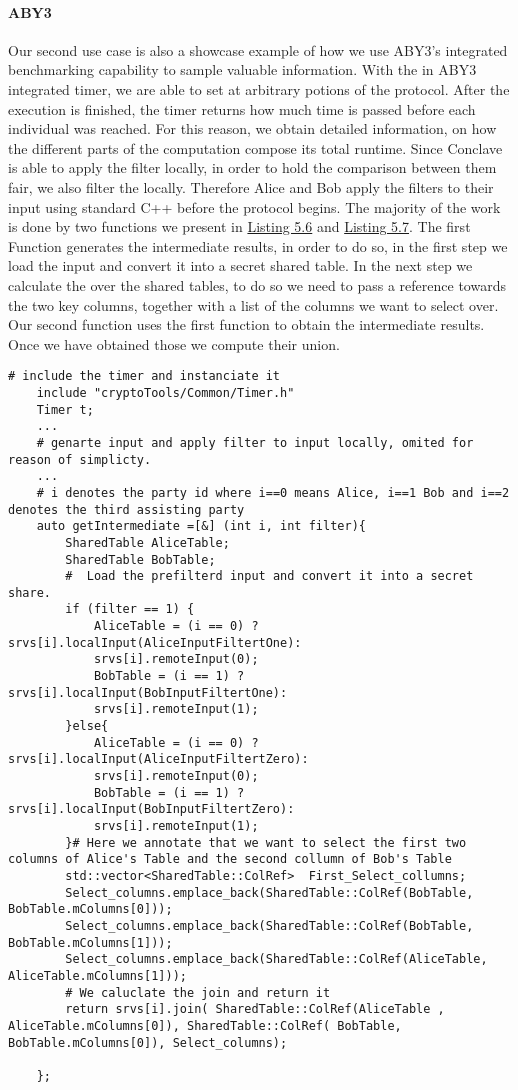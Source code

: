 \paragraph{ABY3}
Our second use case is also a showcase example of how we use ABY3's integrated benchmarking capability to sample valuable information. With the in ABY3 integrated timer, we are able to set  at arbitrary potions of the protocol. After the execution is finished, the timer returns how much time is passed before each individual  was reached. For this reason, we obtain detailed information, on how the different parts of the computation compose its total runtime. Since Conclave is able to apply the filter locally, in order to hold the comparison between them fair, we also filter the locally. Therefore Alice and Bob apply the filters to their input using standard C++ before the protocol begins. The majority of the work is done by two functions we present in \hyperref[Listing 5.6]{Listing 5.6} and \hyperref[Listing 5.7]{Listing 5.7}. The first Function generates the intermediate results, in order to do so, in the first step we load the input and convert it into a secret shared table. In the next step we calculate the  over the shared tables, to do so we need to pass a reference towards the two key columns, together with a list of the columns we want to select over. Our second function uses the first function to obtain the intermediate results. Once we have obtained those we compute their union.       
\label{Listing 5.6}    
 \begin{lstlisting}[caption={Function for our second use case that generates an intermediate result}]
	# include the timer and instanciate it
	include "cryptoTools/Common/Timer.h"
	Timer t;
	...
	# genarte input and apply filter to input locally, omited for reason of simplicty.
	...
	# i denotes the party id where i==0 means Alice, i==1 Bob and i==2 denotes the third assisting party
	auto getIntermediate =[&] (int i, int filter){
		SharedTable AliceTable;
		SharedTable BobTable;
		#  Load the prefilterd input and convert it into a secret share. 
		if (filter == 1) { 
			AliceTable = (i == 0) ? srvs[i].localInput(AliceInputFiltertOne): 
			srvs[i].remoteInput(0); 
			BobTable = (i == 1) ? srvs[i].localInput(BobInputFiltertOne): 
			srvs[i].remoteInput(1);
		}else{
			AliceTable = (i == 0) ? srvs[i].localInput(AliceInputFiltertZero): 
			srvs[i].remoteInput(0);
			BobTable = (i == 1) ? srvs[i].localInput(BobInputFiltertZero): 
			srvs[i].remoteInput(1);
		}# Here we annotate that we want to select the first two columns of Alice's Table and the second collumn of Bob's Table
		std::vector<SharedTable::ColRef>  First_Select_collumns; 
		Select_columns.emplace_back(SharedTable::ColRef(BobTable, BobTable.mColumns[0]));
		Select_columns.emplace_back(SharedTable::ColRef(BobTable, BobTable.mColumns[1]));
		Select_columns.emplace_back(SharedTable::ColRef(AliceTable, AliceTable.mColumns[1]));
		# We caluclate the join and return it
		return srvs[i].join( SharedTable::ColRef(AliceTable , AliceTable.mColumns[0]), SharedTable::ColRef( BobTable, BobTable.mColumns[0]), Select_columns);
		
	};
\end{lstlisting}
